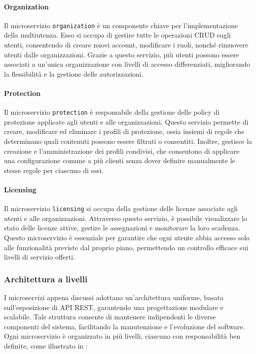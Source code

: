 \paragraph{Organization}
Il microservizio \texttt{organization} è un componente chiave per l'implementazione della multiutenza. Esso si occupa di gestire tutte le operazioni CRUD sugli utenti, consentendo di creare nuovi account, modificare i ruoli, nonché rimuovere utenti dalle organizzazioni.
Grazie a questo servizio, più utenti possono essere associati a un'unica organizzazione con livelli di accesso differenziati, migliorando la flessibilità e la gestione delle autorizzazioni.

\paragraph{Protection}
Il microservizio \texttt{protection} è responsabile della gestione delle policy di protezione applicate agli utenti e alle organizzazioni. Questo servizio permette di creare, modificare ed eliminare i profili di protezione, ossia insiemi di regole che determinano quali contenuti possono essere filtrati o consentiti.
Inoltre, gestisce la creazione e l’amministrazione dei profili condivisi, che consentono di applicare una configurazione comune a più clienti senza dover definire manualmente le stesse regole per ciascuno di essi.

\paragraph{Licensing}
Il microservizio \texttt{licensing} si occupa della gestione delle licenze associate agli utenti e alle organizzazioni. Attraverso questo servizio, è possibile visualizzare lo stato delle licenze attive, gestire le assegnazioni e monitorare la loro scadenza.
Questo microservizio è essenziale per garantire che ogni utente abbia accesso solo alle funzionalità previste dal proprio piano, permettendo un controllo efficace sui livelli di servizio offerti.

\subsubsection{Architettura a livelli}
I microservizi appena discussi adottano un'architettura uniforme, basata sull'esposizione di API REST, garantendo una progettazione modulare e scalabile. Tale struttura consente di mantenere indipendenti le diverse componenti del sistema, facilitando la manutenzione e l'evoluzione del software. Ogni microservizio è organizzato in più livelli, ciascuno con responsabilità ben definite, come illustrato in :

